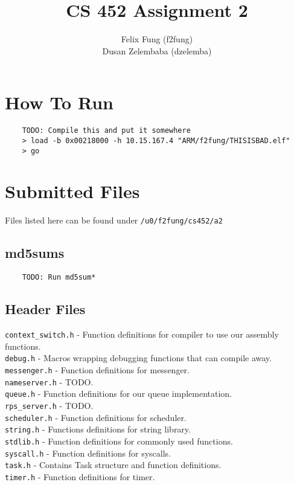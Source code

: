 \documentclass[letterpaper]{article}
\begin{document}
\title{CS 452 Assignment 2}
\author{Felix Fung (f2fung) \\ Dusan Zelembaba (dzelemba)}
\maketitle

\section{How To Run}
\begin{verbatim}
	TODO: Compile this and put it somewhere
	> load -b 0x00218000 -h 10.15.167.4 "ARM/f2fung/THISISBAD.elf"
	> go
\end{verbatim}

\section{Submitted Files}
Files listed here can be found under \verb!/u0/f2fung/cs452/a2!

\subsection{md5sums}
\begin{verbatim}
	TODO: Run md5sum*
\end{verbatim}

\subsection{Header Files}
\verb!context_switch.h! - Function definitions for compiler to use our assembly functions.\\
\verb!debug.h! - Macros wrapping debugging functions that can compile away.\\
\verb!messenger.h! - Function definitions for messenger.\\
\verb!nameserver.h! - TODO.\\
\verb!queue.h! - Function definitions for our queue implementation.\\
\verb!rps_server.h! - TODO.\\
\verb!scheduler.h! - Function definitions for scheduler.\\
\verb!string.h! - Functions definitions for string library.\\
\verb!stdlib.h! - Function definitions for commonly used functions.\\
\verb!syscall.h! - Function definitions for syscalls.\\
\verb!task.h! - Contains Task structure and function definitions.\\
\verb!timer.h! - Function definitions for timer.\\
\end{document}
